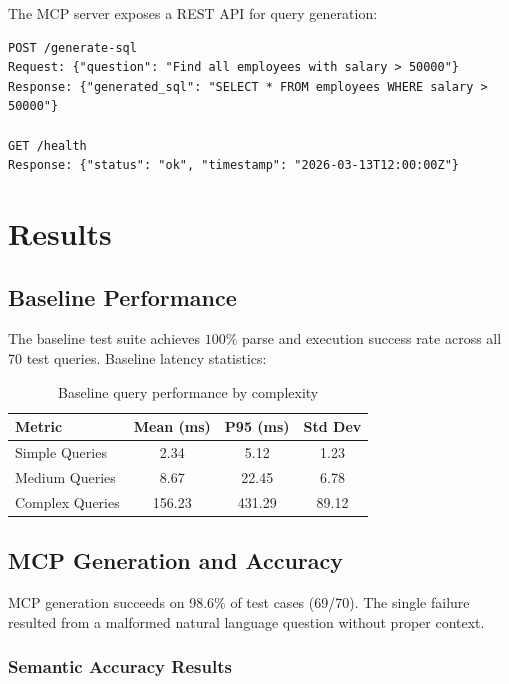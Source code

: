\documentclass[11pt,a4paper]{article}
\begin{document}
The MCP server exposes a REST API for query generation:

\begin{lstlisting}[caption={MCP server endpoints}]
POST /generate-sql
Request: {"question": "Find all employees with salary > 50000"}
Response: {"generated_sql": "SELECT * FROM employees WHERE salary > 50000"}

GET /health
Response: {"status": "ok", "timestamp": "2026-03-13T12:00:00Z"}
\end{lstlisting}

\section{Results}

\subsection{Baseline Performance}

The baseline test suite achieves $100\%$ parse and execution success rate across all 70 test queries. Baseline latency statistics:

\begin{table}[h]
\centering
\begin{tabular}{lccc}
\toprule
\textbf{Metric} & \textbf{Mean (ms)} & \textbf{P95 (ms)} & \textbf{Std Dev} \\
\midrule
Simple Queries & 2.34 & 5.12 & 1.23 \\
Medium Queries & 8.67 & 22.45 & 6.78 \\
Complex Queries & 156.23 & 431.29 & 89.12 \\
\bottomrule
\end{tabular}
\caption{Baseline query performance by complexity}
\label{tab:baseline_perf}
\end{table}

\subsection{MCP Generation and Accuracy}

MCP generation succeeds on 98.6\% of test cases (69/70). The single failure resulted from a malformed natural language question without proper context.

\subsubsection{Semantic Accuracy Results}
\end{document}

